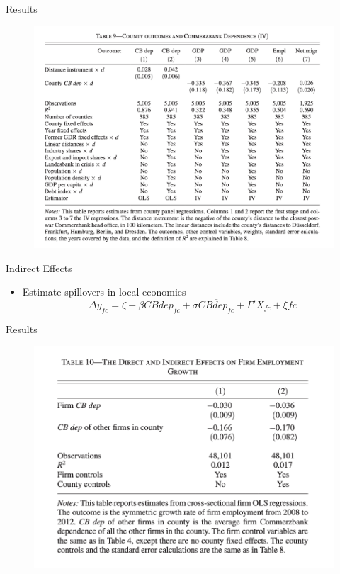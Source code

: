 \documentclass[english,xcolor=svgnames]{beamer}
\begin{document}
\begin{frame}{Results}
\begin{figure}
\includegraphics[scale=0.45]{figures/huber_5}
\end{figure}
\end{frame}

\begin{frame}{Indirect Effects}
\begin{itemize}
\item Estimate spillovers in local economies
\[\Delta y_{fc} = \zeta +  \beta {CBdep_{fc}} +  \sigma \overline{CBdep_{fc}}  + \Gamma' X_{fc} +  \xi{fc} \]
\end{itemize}
\end{frame}

\begin{frame}{Results}
\begin{figure}
\includegraphics[scale=0.45]{figures/huber_6}
\end{figure}
\end{frame}
\end{document}

